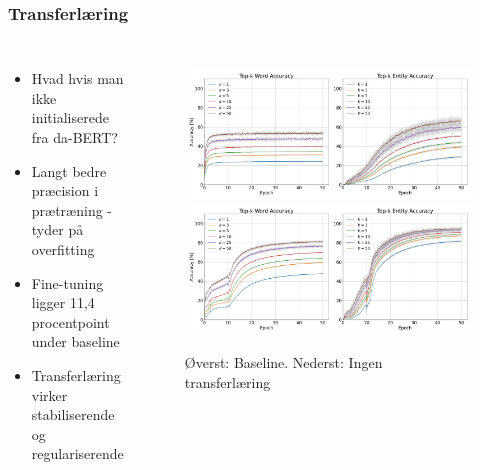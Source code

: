 \documentclass{beamer}
\begin{document}
\begin{frame}
    \frametitle{Transferlæring}
    \begin{columns}
        \begin{itemize}
            \item Hvad hvis man ikke initialiserede fra da-BERT?
            \item Langt bedre præcision i prætræning - tyder på overfitting
            \item Fine-tuning ligger 11,4 procentpoint under baseline
            \item Transferlæring virker stabiliserende og regulariserende
        \end{itemize}
        \begin{figure}[H]
            \centering
            \includegraphics[width=.85\textwidth]{baseline-acc}
            \includegraphics[width=.85\textwidth]{nobert-acc}
            \caption{Øverst: Baseline. Nederst: Ingen transferlæring}
        \end{figure}\noindent
    \end{columns}
\end{frame}
\end{document}
